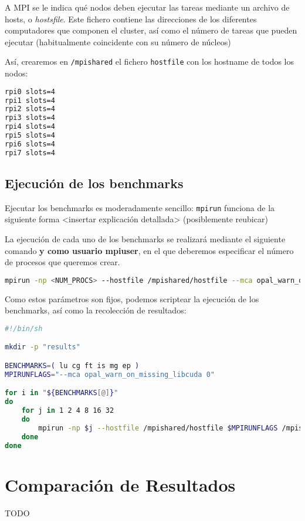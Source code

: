 A MPI se le indica qué nodos deben ejecutar las tareas mediante un archivo de hosts, o \textit{hostsfile}\cite{mpi_hostfile_option}. Este fichero contiene las direcciones de los diferentes computadores que componen el cluster, así como el número de tareas que pueden ejecutar (habitualmente coincidente con su número de núcleos)

Así, crearemos en \texttt{/mpishared} el fichero \texttt{hostfile} con los hostname de todos los nodos:

\begin{lstlisting}[language=bash]
rpi0 slots=4
rpi1 slots=4
rpi2 slots=4
rpi3 slots=4
rpi4 slots=4
rpi5 slots=4
rpi6 slots=4
rpi7 slots=4
\end{lstlisting}

\subsection{Ejecución de los benchmarks}
Ejecutar los benchmarks es moderadamente sencillo: \texttt{mpirun} funciona de la siguiente forma <insertar explicación detallada> (posiblemente reubicar)

La ejecución de cada uno de los benchmarks se realizará mediante el siguiente comando \textbf{y como usuario mpiuser}, en el que deberemos especificar el número de procesos que queremos crear.

\begin{lstlisting}[language=bash]
mpirun -np <NUM_PROCS> --hostfile /mpishared/hostfile --mca opal_warn_on_missing_libcuda 0 /mpishared/NPB3.4.2/NPB3.4-MPI/bin/<KERNEL>.<CLASS>.x
\end{lstlisting}

Como estos parámetros son fijos, podemos scriptear la ejecución de los benchmarks, así como la recolección de resultados:

\begin{lstlisting}[language=bash]
#!/bin/sh

mkdir -p "results"

BENCHMARKS=( lu cg ft is mg ep )
MPIRUNFLAGS="--mca opal_warn_on_missing_libcuda 0"

for i in "${BENCHMARKS[@]}"
do
    for j in 1 2 4 8 16 32
    do
        mpirun -np $j --hostfile /mpishared/hostfile $MPIRUNFLAGS /mpishared/NPB3.4.2/NPB3.4-MPI/bin/${i}.*.x | tee -a results/$i.$j.run
    done
done
\end{lstlisting}

\section{Comparación de Resultados}
TODO